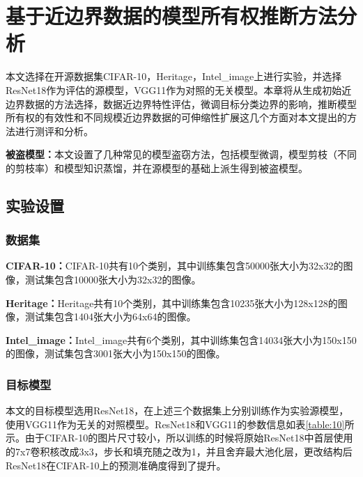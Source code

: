 
\chapter{基于近边界数据的模型所有权推断方法分析}\label{5}

本文选择在开源数据集CIFAR-10\cite{krizhevsky2009learning}，Heritage\cite{Heritage}，Intel\_image\cite{Intel_image}上进行实验，并选择ResNet18作为评估的源模型，VGG11作为对照的无关模型。本章将从生成初始近边界数据的方法选择，数据近边界特性评估，微调目标分类边界的影响，推断模型所有权的有效性和不同规模近边界数据的可伸缩性扩展这几个方面对本文提出的方法进行测评和分析。

\noindent\textbf{被盗模型：}本文设置了几种常见的模型盗窃方法，包括模型微调，模型剪枝（不同的剪枝率）和模型知识蒸馏，并在源模型的基础上派生得到被盗模型。

\section{实验设置}\label{5.1}

\subsection{数据集}

\noindent\textbf{CIFAR-10：}CIFAR-10共有10个类别，其中训练集包含50000张大小为32x32的图像，测试集包含10000张大小为32x32的图像。

\noindent\textbf{Heritage：}Heritage共有10个类别，其中训练集包含10235张大小为128x128的图像，测试集包含1404张大小为64x64的图像。

\noindent\textbf{Intel\_image：}Intel\_image共有6个类别，其中训练集包含14034张大小为150x150的图像，测试集包含3001张大小为150x150的图像。

\subsection{目标模型}

本文的目标模型选用ResNet18，在上述三个数据集上分别训练作为实验源模型，使用VGG11作为无关的对照模型。ResNet18和VGG11的参数信息如表\ref{table:10}所示。由于CIFAR-10的图片尺寸较小，所以训练的时候将原始ResNet18中首层使用的7x7卷积核改成3x3，步长和填充随之改为1，并且舍弃最大池化层，更改结构后ResNet18在CIFAR-10上的预测准确度得到了提升。

